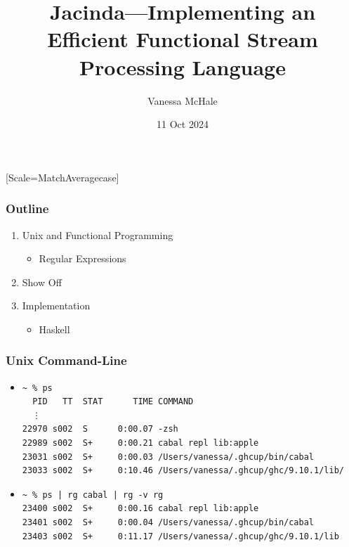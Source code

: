 \documentclass{beamer}
\begin{document}
\setmonofont{Jet Brains Mono}[Scale=MatchAveragecase]

\renewcommand{\arraystretch}{0.8}

\newcommand{\blue}[2] {\textcolor{blue}{#1}}
\newcommand{\green}[2] {\textcolor{green}{#1}}

\newcommand{\intermezzo}[1]{\title{#1}\author{}\date{}\begin{frame}\titlepage\end{frame}}
\def\nil{\hspace{0pt}}
\def\nl{\crcr\noalign {\kern 3\dimen11\nointerlineskip}}
\def\bracel#1{\nl \upbracefill \nl\hfill \small{#1} \hfill\nl}

\title{Jacinda---Implementing an Efficient Functional Stream Processing Language}
\author{Vanessa McHale}
\date{11 Oct 2024}

\begin{frame}
\titlepage
\end{frame}

\begin{frame}
  \frametitle{Outline}
  \begin{enumerate}
    \item Unix and Functional Programming
      \begin{itemize}
        \item Regular Expressions
      \end{itemize}
    \item Show Off
    \item Implementation
      \begin{itemize}
        \item Haskell
      \end{itemize}
  \end{enumerate}
\end{frame}

\begin{frame}[fragile]
  \frametitle{Unix Command-Line}
  \begin{itemize}
    \item
      \begin{verbatim}
~ % ps
  PID   TT  STAT      TIME COMMAND
  ⋮
22970 s002  S      0:00.07 -zsh
22989 s002  S+     0:00.21 cabal repl lib:apple
23031 s002  S+     0:00.03 /Users/vanessa/.ghcup/bin/cabal
23033 s002  S+     0:10.46 /Users/vanessa/.ghcup/ghc/9.10.1/lib/
      \end{verbatim}
      \item
        \begin{verbatim}
~ % ps | rg cabal | rg -v rg
23400 s002  S+     0:00.16 cabal repl lib:apple
23401 s002  S+     0:00.04 /Users/vanessa/.ghcup/bin/cabal
23403 s002  S+     0:11.17 /Users/vanessa/.ghcup/ghc/9.10.1/lib
        \end{verbatim}
  \end{itemize}
\end{frame}
\end{document}
